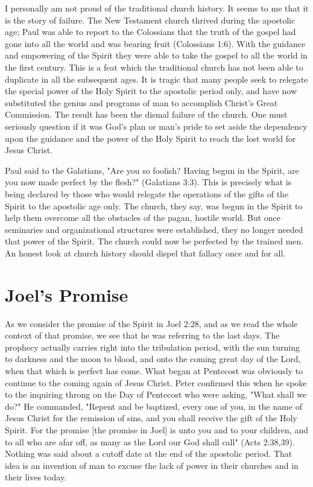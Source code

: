 I personally am not proud of the traditional church history. It seems to me that it is the story of failure. The New Testament church thrived during the apostolic age; Paul was able to report to the Colossians that the truth of the gospel had gone into all the world and was bearing fruit (Colossians 1:6). With the guidance and empowering of the Spirit they were able to take the gospel to all the world in the first century. This is a feat which the traditional church has not been able to duplicate in all the subsequent ages. It is tragic that many people seek to relegate the special power of the Holy Spirit to the apostolic period only, and have now substituted the genius and programs of man to accomplish Christ's Great Commission. The result has been the dismal failure of the church. One must seriously question if it was God's plan or man's pride to set aside the dependency upon the guidance and the power of the Holy Spirit to reach the lost world for Jesus Christ. 

Paul said to the Galatians, "Are you so foolish? Having begun in the Spirit, are you now made perfect by the flesh?" (Galatians 3:3). This is precisely what is being declared by those who would relegate the operations of the gifts of the Spirit to the apostolic age only. The church, they say, was begun in the Spirit to help them overcome all the obstacles of the pagan, hostile world. But once seminaries and organizational structures were established, they no longer needed that power of the Spirit. The church could now be perfected by the trained men. An honest look at church history should dispel that fallacy once and for all. 

\section*{Joel's Promise}

As we consider the promise of the Spirit in Joel 2:28, and as we read the whole context of that promise, we see that he was referring to the last days. The prophecy actually carries right into the tribulation period, with the sun turning to darkness and the moon to blood, and onto the coming great day of the Lord, when that which is perfect has come. What began at Pentecost was obviously to continue to the coming again of Jesus Christ. Peter confirmed this when he spoke to the inquiring throng on the Day of Pentecost who were asking, "What shall we do?" He commanded, "Repent and be baptized, every one of you, in the name of Jesus Christ for the remission of sins, and you shall receive the gift of the Holy Spirit. For the promise [the promise in Joel] is unto you and to your children, and to all who are afar off, as many as the Lord our God shall call" (Acts 2:38,39). Nothing was said about a cutoff date at the end of the apostolic period. That idea is an invention of man to excuse the lack of power in their churches and in their lives today. 

